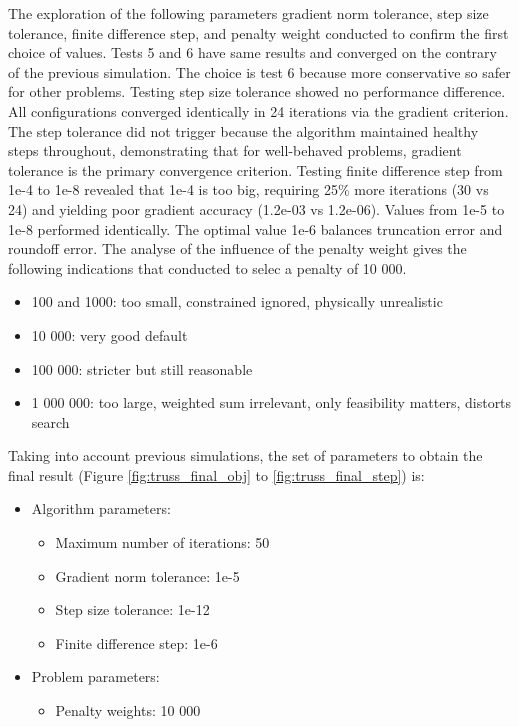 The exploration of the following parameters gradient norm tolerance, step size tolerance, finite difference step, and penalty weight conducted to confirm the first choice of values.
Tests 5 and 6 have same results and converged on the contrary of the previous simulation. The choice is test 6 because more conservative so safer for other problems.
Testing step size tolerance showed no performance difference. All configurations converged identically in 24 iterations via the gradient criterion. The step tolerance did not trigger because the algorithm maintained healthy steps throughout, demonstrating that for well-behaved problems, gradient tolerance is the primary convergence criterion.
Testing finite difference step from 1e-4 to 1e-8 revealed that 1e-4 is too big, requiring 25\% more iterations (30 vs 24) and yielding poor gradient accuracy (1.2e-03 vs 1.2e-06). Values from 1e-5 to 1e-8 performed identically. The optimal value 1e-6 balances truncation error and roundoff error.
The analyse of the influence of the penalty weight gives the following indications that conducted to selec a penalty of 10 000.
\begin{itemize}
	\item 100 and 1000: too small, constrained ignored, physically unrealistic
	\item 10 000: very good default
	\item 100 000: stricter but still reasonable
	\item 1 000 000: too large, weighted sum irrelevant, only feasibility matters, distorts search
\end{itemize}

Taking into account previous simulations, the set of parameters to obtain the final result (Figure \ref{fig:truss_final_obj} to \ref{fig:truss_final_step}) is:
\begin{itemize}
	\item Algorithm parameters:
		\begin{itemize}
			\item Maximum number of iterations: 50
			\item Gradient norm tolerance: 1e-5
			\item Step size tolerance: 1e-12
			\item Finite difference step: 1e-6
		\end{itemize}
	\item Problem parameters:
		\begin{itemize}
			\item Penalty weights: 10 000
		\end{itemize}
\end{itemize}


